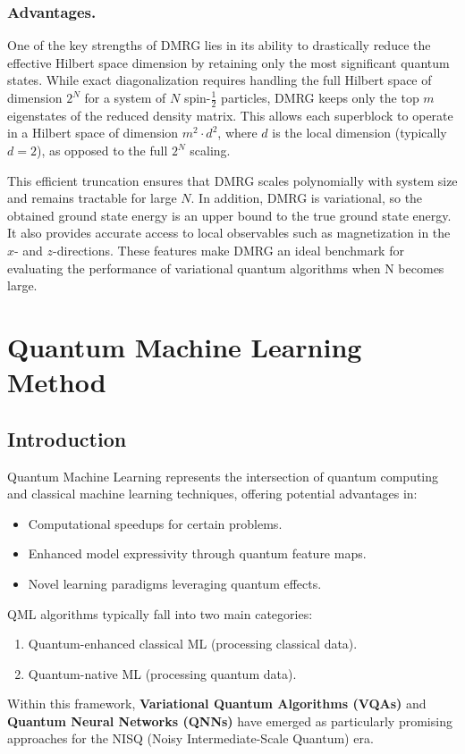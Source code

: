\documentclass[pre,twocolumn,floatfix]{revtex4-1}
\begin{document}
\subsubsection{Advantages.}
One of the key strengths of DMRG lies in its ability to drastically reduce the effective Hilbert space dimension by retaining only the most significant quantum states. While exact diagonalization requires handling the full Hilbert space of dimension $2^N$ for a system of $N$ spin-$\tfrac{1}{2}$ particles, DMRG keeps only the top $m$ eigenstates of the reduced density matrix. This allows each superblock to operate in a Hilbert space of dimension $m^2 \cdot d^2$, where $d$ is the local dimension (typically $d=2$), as opposed to the full $2^N$ scaling.

This efficient truncation ensures that DMRG scales polynomially with system size and remains tractable for large $N$. In addition, DMRG is variational, so the obtained ground state energy is an upper bound to the true ground state energy. It also provides accurate access to local observables such as magnetization in the $x$- and $z$-directions. These features make DMRG an ideal benchmark for evaluating the performance of variational quantum algorithms when N becomes large.

\section{Quantum Machine Learning Method} 
\subsection{Introduction}
Quantum Machine Learning represents the intersection of quantum computing and classical machine learning techniques, offering potential advantages in:
\begin{itemize}
    \item Computational speedups for certain problems.
    \item Enhanced model expressivity through quantum feature maps.
    \item Novel learning paradigms leveraging quantum effects.
\end{itemize}

QML algorithms typically fall into two main categories:
\begin{enumerate}
    \item Quantum-enhanced classical ML (processing classical data).
    \item Quantum-native ML (processing quantum data).
\end{enumerate}
Within this framework, \textbf{Variational Quantum Algorithms (VQAs)} and \textbf{Quantum Neural Networks (QNNs)} have emerged as particularly promising approaches for the NISQ (Noisy Intermediate-Scale Quantum) era.
\end{document}
